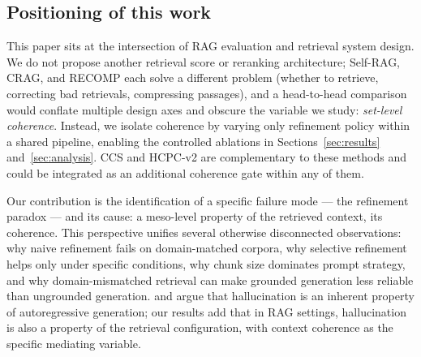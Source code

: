 \subsection{Positioning of this work}

This paper sits at the intersection of RAG evaluation and retrieval
system design. We do not propose another retrieval score or reranking
architecture; Self-RAG, CRAG, and RECOMP each solve a different problem
(whether to retrieve, correcting bad retrievals, compressing passages),
and a head-to-head comparison would conflate multiple design axes and
obscure the variable we study: \emph{set-level coherence}. Instead, we
isolate coherence by varying only refinement policy within a shared
pipeline, enabling the controlled ablations in
Sections~\ref{sec:results} and~\ref{sec:analysis}. CCS and HCPC-v2 are
complementary to these methods and could be integrated as an additional
coherence gate within any of them.

Our contribution is the identification of a specific failure mode —
the refinement paradox — and its cause: a meso-level property of the
retrieved context, its coherence. This perspective unifies several
otherwise disconnected observations: why naive refinement fails on
domain-matched corpora, why selective refinement helps only under
specific conditions, why chunk size dominates prompt strategy, and why
domain-mismatched retrieval can make grounded generation less reliable
than ungrounded generation. \citet{ji2023hallucination} and
\citet{xu2024hallucination} argue that hallucination is an inherent
property of autoregressive generation; our results add that in RAG
settings, hallucination is also a property of the retrieval
configuration, with context coherence as the specific mediating
variable.
